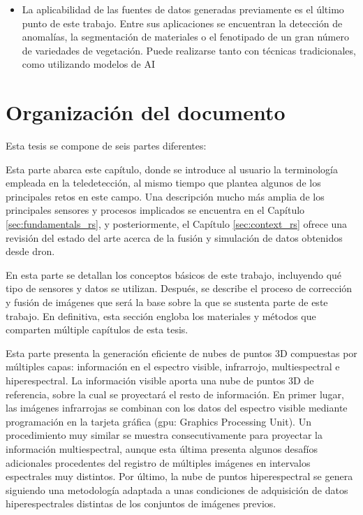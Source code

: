 \begin{itemize}
    \item La aplicabilidad de las fuentes de datos generadas previamente es el último punto de este trabajo. Entre sus aplicaciones se encuentran la detección de anomalías, la segmentación de materiales o el fenotipado de un gran número de variedades de vegetación. Puede realizarse tanto con técnicas tradicionales, como utilizando modelos de AI
\end{itemize}

\section{Organización del documento}

Esta tesis se compone de seis partes diferentes:

\small {} \normalsize\hspace{3mm} Esta parte abarca este capítulo, donde se introduce al usuario la terminología empleada en la teledetección, al mismo tiempo que plantea algunos de los principales retos en este campo. Una descripción mucho más amplia de los principales sensores y procesos implicados se encuentra en el Capítulo \ref{sec:fundamentals_rs}, y posteriormente, el Capítulo \ref{sec:context_rs} ofrece una revisión del estado del arte acerca de la fusión y simulación de datos obtenidos desde dron.

\small {} \normalsize\hspace{3mm} En esta parte se detallan los conceptos básicos de este trabajo, incluyendo qué tipo de sensores y datos se utilizan. Después, se describe el proceso de corrección y fusión de imágenes que será la base sobre la que se sustenta parte de este trabajo. En definitiva, esta sección engloba los materiales y métodos que comparten múltiple capítulos de esta tesis.

\small {} \normalsize\hspace{3mm} Esta parte presenta la generación eficiente de nubes de puntos 3D compuestas por múltiples capas: información en el espectro visible, infrarrojo, multiespectral e hiperespectral. La información visible aporta una nube de puntos 3D de referencia, sobre la cual se proyectará el resto de información. En primer lugar, las imágenes infrarrojas se combinan con los datos del espectro visible mediante programación en la tarjeta gráfica (\acrshort{gpu}: Graphics Processing Unit). Un procedimiento muy similar se muestra consecutivamente para proyectar la información multiespectral, aunque esta última presenta algunos desafíos adicionales procedentes del registro de múltiples imágenes en intervalos espectrales muy distintos. Por último, la nube de puntos hiperespectral se genera siguiendo una metodología adaptada a unas condiciones de adquisición de datos hiperespectrales distintas de los conjuntos de imágenes previos.

